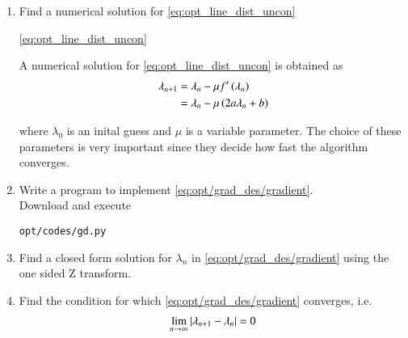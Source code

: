 \renewcommand{\theequation}{\theenumi}
\begin{enumerate}[label=\thesection.\arabic*.,ref=\thesection.\theenumi]
%
%

\item
Find a numerical solution for \eqref{eq:opt_line_dist_uncon}

\eqref{eq:opt_line_dist_uncon}

%
%
\solution
A numerical solution for \eqref{eq:opt_line_dist_uncon} is obtained as
%
\begin{align}
\lambda_{n+1}&=\lambda_{n}-\mu f^{\prime}\brak{\lambda_n}
\\
&=\lambda_{n} -\mu \brak{2a\lambda_n+b}
\label{eq:opt/grad_des/gradient}
\end{align}

%
where $\lambda_0$ is an inital guess and $\mu$ is a variable parameter. The choice of these parameters is very important since they decide how fast the algorithm converges.
%
\item
Write a program to implement \eqref{eq:opt/grad_des/gradient}.
%
\\
\solution Download and execute
\begin{lstlisting}
opt/codes/gd.py
\end{lstlisting}
%
\item Find a closed form solution for $\lambda_n$ in  \eqref{eq:opt/grad_des/gradient} using the one sided Z transform.
%
\item Find the condition for which \eqref{eq:opt/grad_des/gradient} converges, i.e.
\begin{align}
\lim_{n \to \infty}\left\vert\lambda_{n+1}-\lambda_n\right\vert = 0
\end{align}
\end{enumerate}


